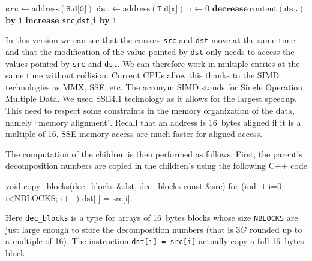 \documentclass[reqno,11pt]{amsart}
\theoremstyle{plain}
\theoremstyle{definition}
\renewcommand{\leq}{\leqslant}
\renewcommand{\tt}[1]{\texttt{#1}}
\begin{document}
\begin{algorithmic}
\State $\tt{src}\gets \text{address}(\tt{S.d[0]})$
\State $\tt{dst}\gets \text{address}(\tt{T.d[x]})$
\State $\tt{i}\gets 0$
\While{$\tt{i}\leq \tt{3G}-\tt{x}$}
\If{$\text{content}(\tt{src})>0$}
\State $\textbf{decrease}\ \text{content}(\tt{dst})$ \textbf{by} $1$\EndIf
\State \textbf{increase} \tt{src},\tt{dst},\tt{i} \textbf{by} $1$

\EndWhile
\end{algorithmic}

\noindent In this version we can see that the cursors \texttt{src} and
\texttt{dst} move at the same time and that the modification of the value
pointed by \texttt{dst} only needs to access the values pointed by \tt{src}
and \tt{dst}.  We can therefore work in multiple entries at the same time
without collision.  Current CPUs allow this thanks to the SIMD technologies as
MMX, SSE, etc.  The acronym SIMD stands for Single Operation Multiple Data.
We used SSE4.1 technology as it allows for the largest speedup. This need to
respect some constraints in the memory organization of the data, namely
``memory alignment''. Recall that an address is 16~bytes aligned if it is a
multiple of 16. SSE memory access are much faster for aligned access.

The computation of the children is then performed as follows. First, the
parent's decomposition numbers are copied in the children's using the
following C++ code
\begin{listing}{1}
void copy_blocks(dec_blocks &dst, dec_blocks const &src) {
  for (ind_t i=0; i<NBLOCKS; i++) dst[i] = src[i];
}
\end{listing}
Here \tt{dec\_blocks} is a type for arrays of 16~bytes blocks whose size
\tt{NBLOCKS} are just large enough to store the decomposition numbers (that is
$3G$ rounded up to a multiple of 16). The instruction \tt{dst[i] = src[i]}
actually copy a full 16~bytes block.
\end{document}
